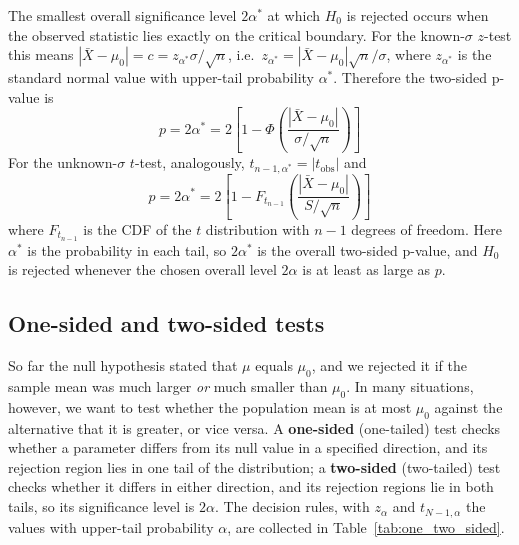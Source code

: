 \documentclass[letterpaper,11pt,leqno]{book}
\begin{document}
The smallest overall significance level $2\alpha^*$ at which $H_0$ is rejected occurs when the observed statistic lies exactly on the critical boundary. For the known-$\sigma$ $z$-test this means $|\bar{X} - \mu_0| = c = z_{\alpha^*}\sigma/\sqrt{n}$, i.e.\ $z_{\alpha^*} = |\bar{X} - \mu_0|\sqrt{n}/\sigma$, where $z_{\alpha^*}$ is the standard normal value with upper-tail probability $\alpha^*$. Therefore the two-sided p-value is
\begin{equation}
\boxed{p = 2\alpha^* = 2\left[1 - \Phi\left(\frac{|\bar{X} - \mu_0|}{\sigma/\sqrt{n}}\right)\right]}
\label{eq:p_value_z}
\end{equation}
For the unknown-$\sigma$ $t$-test, analogously, $t_{n-1,\alpha^*} = |t_{\text{obs}}|$ and
\begin{equation}
\boxed{p = 2\alpha^* = 2\left[1 - F_{t_{n-1}}\left(\frac{|\bar{X} - \mu_0|}{S/\sqrt{n}}\right)\right]}
\label{eq:p_value_t}
\end{equation}
where $F_{t_{n-1}}$ is the CDF of the $t$ distribution with $n - 1$ degrees of freedom. Here $\alpha^*$ is the probability in each tail, so $2\alpha^*$ is the overall two-sided p-value, and $H_0$ is rejected whenever the chosen overall level $2\alpha$ is at least as large as $p$.

\subsection{One-sided and two-sided tests}

So far the null hypothesis stated that $\mu$ equals $\mu_0$, and we rejected it if the sample mean was much larger \emph{or} much smaller than $\mu_0$. In many situations, however, we want to test whether the population mean is at most $\mu_0$ against the alternative that it is greater, or vice versa. A \textbf{one-sided} (one-tailed) test checks whether a parameter differs from its null value in a specified direction, and its rejection region lies in one tail of the distribution; a \textbf{two-sided} (two-tailed) test checks whether it differs in either direction, and its rejection regions lie in both tails, so its significance level is $2\alpha$. The decision rules, with $z_\alpha$ and $t_{N-1,\alpha}$ the values with upper-tail probability $\alpha$, are collected in Table~\ref{tab:one_two_sided}.
\end{document}
